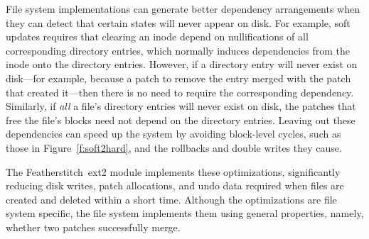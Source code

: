 \documentclass[9pt,twocolumn,letterpaper]{article}
\newcommand{\Kudos}{Featherstitch}
\newcommand{\patch}{patch}
\newcommand{\patches}{patches}
\newcommand{\Patch}{Patch}
\begin{document}
File system implementations can generate better dependency arrangements
when they can detect that certain states will never appear on disk.
%
For example, soft updates requires that clearing an inode
depend on nullifications of all corresponding directory entries, which
normally induces dependencies from the inode onto the directory
entries.
%
However, if a directory entry will never exist on disk---for example,
because a patch to remove the entry merged with the patch that created
it---then there is no need to require the corresponding dependency.
%
Similarly, if \emph{all} a file's directory entries will never exist on
disk, the patches that free the file's blocks need not depend on the
directory entries.
%
Leaving out these dependencies can speed up the system by avoiding
block-level cycles, such as those in Figure~\ref{f:soft2hard}, and the
rollbacks and double writes they cause.
%
\begin{comment}
A dependency from the inode clear onto the directory entry clear is
sufficient to ensure this property. However, when a directory entry
will never exist on disk because it is created and removed before the
creation is committed, the inode clear need not depend on the
directory entry clear.
\end{comment}
%
The \Kudos\ ext2 module implements these optimizations,
%
significantly reducing disk writes, patch allocations, and undo data required
when files are created and deleted within a short time.
%
Although the optimizations are file system specific, the file system
implements them using general properties, namely, whether two patches
successfully merge.


\end{document}
